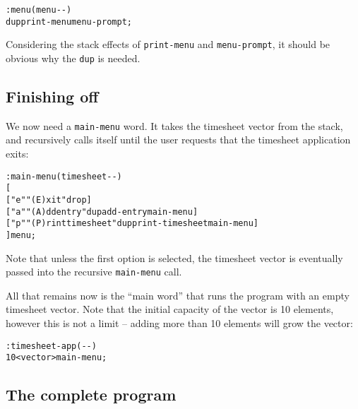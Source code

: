 \documentclass[english]{article}
\begin{document}
\begin{alltt}
: menu ( menu -{}- )
    dup print-menu menu-prompt ;
\end{alltt}

Considering the stack effects of \texttt{print-menu} and \texttt{menu-prompt}, it should be obvious why the \texttt{dup} is needed.

\subsection{Finishing off}

We now need a \texttt{main-menu} word. It takes the timesheet vector from the stack, and recursively calls itself until the user requests that the timesheet application exits:

\begin{alltt}
: main-menu ( timesheet -{}- )
    {[}
        {[} "e" "(E)xit" drop {]}
        {[} "a" "(A)dd entry" dup add-entry main-menu {]}
        {[} "p" "(P)rint timesheet" dup print-timesheet main-menu {]}
    {]} menu ;
\end{alltt}

Note that unless the first option is selected, the timesheet vector is eventually passed into the recursive \texttt{main-menu} call.

All that remains now is the ``main word'' that runs the program with an empty timesheet vector. Note that the initial capacity of the vector is 10 elements, however this is not a limit -- adding more than 10 elements will grow the vector:

\begin{alltt}
: timesheet-app ( -{}- )
    10 <vector> main-menu ;
\end{alltt}

\subsection{The complete program}
\end{document}
